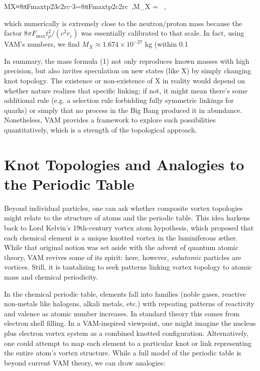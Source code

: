 MX≈8πFmaxtp23c2rc⋅3=8πFmaxtp2c2rc ,M_X \approx {}  = ~,

which numerically is extremely close to the neutron/proton mass because the factor $8\pi F_{\text{max}} t_p^2/(c^2 r_c)$ was essentially calibrated to that scale. In fact, using VAM’s numbers, we find $M_X \approx 1.674\times10^{-27}$ kg (within 0.1%


In summary, the mass formula (1) not only reproduces known masses with high precision, but also invites speculation on new states (like X) by simply changing knot topology. The existence or non-existence of X in reality would depend on whether nature realizes that specific linking; if not, it might mean there’s some additional rule (e.g. a selection rule forbidding fully symmetric linkings for quarks) or simply that no process in the Big Bang produced it in abundance. Nonetheless, VAM provides a framework to explore such possibilities quantitatively, which is a strength of the topological approach.


\section*{Knot Topologies and Analogies to the Periodic Table}

Beyond individual particles, one can ask whether composite vortex topologies might relate to the structure of atoms and the periodic table. This idea harkens back to Lord Kelvin’s 19th-century vortex atom hypothesis, which proposed that each chemical element is a unique knotted vortex in the luminiferous æther. While that original notion was set aside with the advent of quantum atomic theory, VAM revives some of its spirit: here, however, \textit{subatomic} particles are vortices. Still, it is tantalizing to seek patterns linking vortex topology to atomic mass and chemical periodicity.


In the chemical periodic table, elements fall into families (noble gases, reactive non-metals like halogens, alkali metals, etc.) with repeating patterns of reactivity and valence as atomic number increases. In standard theory this comes from electron shell filling. In a VAM-inspired viewpoint, one might imagine the nucleus plus electron vortex system as a combined knotted configuration. Alternatively, one could attempt to map each element to a particular knot or link representing the entire atom’s vortex structure. While a full model of the periodic table is beyond current VAM theory, we can draw analogies:


